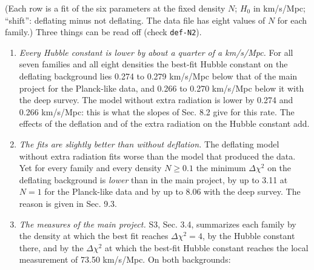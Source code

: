 \documentclass[
  10pt,
]{article}
\providecommand{\tightlist}{%
  \setlength{\itemsep}{0pt}\setlength{\parskip}{0pt}}
\begin{document}
(Each row is a fit of the six parameters at the fixed density \(N\);
\(H_0\) in km/s/Mpc; ``shift'': deflating minus not deflating. The data
file has eight values of \(N\) for each family.) Three things can be
read off (check \texttt{def-N2}).

\begin{enumerate}
\def\labelenumi{\arabic{enumi}.}
\tightlist
\item
  \emph{Every Hubble constant is lower by about a quarter of a
  km/s/Mpc.} For all seven families and all eight densities the best-fit
  Hubble constant on the deflating background lies 0.274 to 0.279
  km/s/Mpc below that of the main project for the Planck-like data, and
  0.266 to 0.270 km/s/Mpc below it with the deep survey. The model
  without extra radiation is lower by 0.274 and 0.266 km/s/Mpc: this is
  what the slopes of Sec. 8.2 give for this rate. The effects of the
  deflation and of the extra radiation on the Hubble constant add.
\item
  \emph{The fits are slightly better than without deflation.} The
  deflating model without extra radiation fits worse than the model that
  produced the data. Yet for every family and every density \(N\ge0.1\)
  the minimum \(\Delta\chi^2\) on the deflating background is
  \emph{lower} than in the main project, by up to 3.11 at \(N=1\) for
  the Planck-like data and by up to 8.06 with the deep survey. The
  reason is given in Sec. 9.3.
\item
  \emph{The measures of the main project.} S3, Sec. 3.4, summarizes each
  family by the density at which the best fit reaches
  \(\Delta\chi^2=4\), by the Hubble constant there, and by the
  \(\Delta\chi^2\) at which the best-fit Hubble constant reaches the
  local measurement of 73.50 km/s/Mpc. On both backgrounds:
\end{enumerate}
\end{document}
